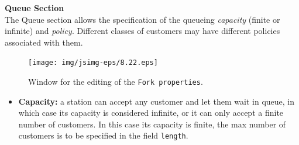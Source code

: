 \noindent \textbf{Queue Section}\\
 The Queue section allows the
specification of the queueing \emph{capacity} (finite or infinite)
and \emph{policy}. Different classes of customers may have
different policies associated with
them.\\
\begin{figure}[htb]
    \begin{center}
        \texttt{[image: img/jsimg-eps/8.22.eps]}
    \end{center}
    \caption{Window for the editing of the \texttt{Fork properties}.}
    \label{fig:forkpropwind}
\end{figure}
\begin{itemize}
\item \textbf{Capacity:} a station can accept any customer and let
them wait in queue, in which case its capacity is considered
infinite, or it can only accept a finite number of customers. In
this case its capacity is finite, the max number of customers is
to be specified in the field \texttt{length}.


\end{itemize}
